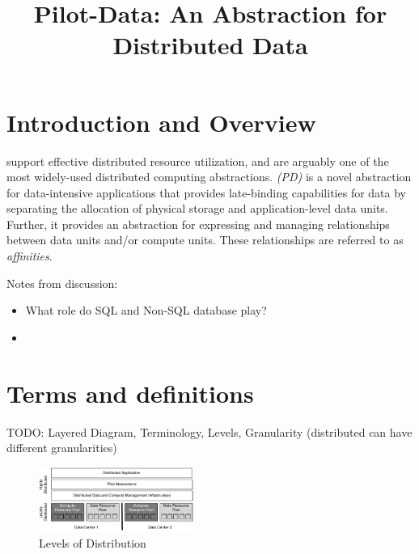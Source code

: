 \documentclass[conference]{IEEEtran}
\begin{document}

\title{Pilot-Data: An Abstraction for Distributed Data}

\author{}

\date{}
\maketitle

\begin{abstract} 


\end{abstract}

\section{Introduction and Overview} 

\pilotjobs support effective distributed resource utilization, and are
arguably one of the most widely-used distributed computing abstractions.
\emph{\pilotdata (PD)} is a novel abstraction for data-intensive applications
that provides late-binding capabilities for data by separating the allocation
of physical storage and application-level data units. Further, it provides an
abstraction for expressing and managing relationships between data units
and/or compute units. These relationships are referred to as
\emph{affinities}.

Notes from discussion:
\begin{itemize}
	\item What role do SQL and Non-SQL database play?
	\item 
\end{itemize}


\section{Terms and definitions}

TODO: Layered Diagram, Terminology, Levels, Granularity (distributed can have 
different granularities)

\begin{figure}[htbp]
	\centering
		\includegraphics[width=0.45\textwidth]{figures/terminology.pdf}
	\caption{Levels of Distribution}
	\label{fig:figures_terminology}
\end{figure}
\end{document}
